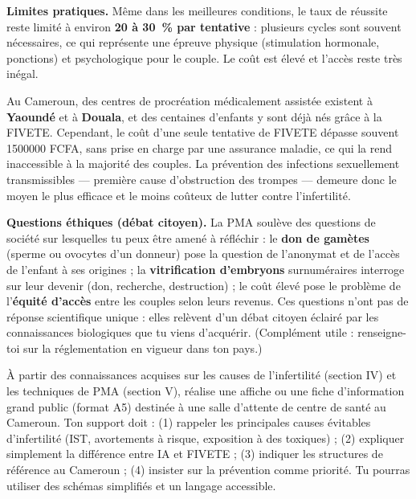 \documentclass[11pt]{article}
\begin{document}
\textbf{Limites pratiques.} Même dans les meilleures conditions, le taux de réussite reste limité à environ \textbf{20 à \SI{30}{\percent} par tentative} : plusieurs cycles sont souvent nécessaires, ce qui représente une épreuve physique (stimulation hormonale, ponctions) et psychologique pour le couple. Le coût est élevé et l'accès reste très inégal.

\begin{savaistu}
Au Cameroun, des centres de procréation médicalement assistée existent à \textbf{Yaoundé} et à \textbf{Douala}, et des centaines d'enfants y sont déjà nés grâce à la FIVETE. Cependant, le coût d'une seule tentative de FIVETE dépasse souvent \num{1500000} FCFA, sans prise en charge par une assurance maladie, ce qui la rend inaccessible à la majorité des couples. La prévention des infections sexuellement transmissibles — première cause d'obstruction des trompes — demeure donc le moyen le plus efficace et le moins coûteux de lutter contre l'infertilité.
\end{savaistu}

\textbf{Questions éthiques (débat citoyen).} La PMA soulève des questions de société sur lesquelles tu peux être amené à réfléchir : le \textbf{don de gamètes} (sperme ou ovocytes d'un donneur) pose la question de l'anonymat et de l'accès de l'enfant à ses origines ; la \textbf{vitrification d'embryons} surnuméraires interroge sur leur devenir (don, recherche, destruction) ; le coût élevé pose le problème de l'\textbf{équité d'accès} entre les couples selon leurs revenus. Ces questions n'ont pas de réponse scientifique unique : elles relèvent d'un débat citoyen éclairé par les connaissances biologiques que tu viens d'acquérir. (Complément utile : renseigne-toi sur la réglementation en vigueur dans ton pays.)

\begin{exercice}
À partir des connaissances acquises sur les causes de l'infertilité (section IV) et les techniques de PMA (section V), réalise une affiche ou une fiche d'information grand public (format A5) destinée à une salle d'attente de centre de santé au Cameroun. Ton support doit : (1) rappeler les principales causes évitables d'infertilité (IST, avortements à risque, exposition à des toxiques) ; (2) expliquer simplement la différence entre IA et FIVETE ; (3) indiquer les structures de référence au Cameroun ; (4) insister sur la prévention comme priorité. Tu pourras utiliser des schémas simplifiés et un langage accessible.
\end{exercice}
\end{document}
